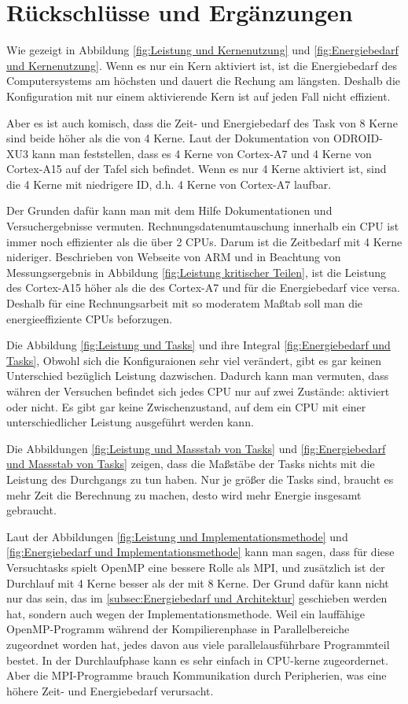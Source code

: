 \chapter{Rückschlüsse und Ergänzungen}
\label{chap:Rueckschluesse und Ergaenzunen}

Wie gezeigt in Abbildung \ref{fig:Leistung und Kernenutzung} und \ref{fig:Energiebedarf und Kernenutzung}. Wenn es nur ein Kern aktiviert ist, ist die Energiebedarf des Computersystems am höchsten und dauert die Rechung am längsten. Deshalb die Konfiguration mit nur einem aktivierende Kern ist auf jeden Fall nicht effizient. 

Aber es ist auch komisch, dass die Zeit- und Energiebedarf des Task von 8 Kerne sind beide höher als die von 4 Kerne. Laut der Dokumentation von ODROID-XU3 kann man feststellen, dass es 4 Kerne von Cortex-A7 und 4 Kerne von Cortex-A15 auf der Tafel sich befindet. Wenn es nur 4 Kerne aktiviert ist, sind die 4 Kerne mit niedrigere ID, d.h. 4 Kerne von Cortex-A7 laufbar. 

Der Grunden dafür kann man mit dem Hilfe Dokumentationen und Versuchergebnisse vermuten. Rechnungsdatenumtauschung innerhalb ein CPU ist immer noch effizienter als die über 2 CPUs. Darum ist die Zeitbedarf mit 4 Kerne nideriger. Beschrieben von Webseite von ARM und in Beachtung von Messungsergebnis in Abbildung \ref{fig:Leistung kritischer Teilen}, ist die Leistung des Cortex-A15 höher als die des Cortex-A7 und für die Energiebedarf vice versa. Deshalb für eine Rechnungsarbeit mit so moderatem Maßtab soll man die energieeffiziente CPUs beforzugen.

Die Abbildung \ref{fig:Leistung und Tasks} und ihre Integral \ref{fig:Energiebedarf und Tasks}, Obwohl sich die Konfiguraionen sehr viel verändert, gibt es gar keinen Unterschied bezüglich Leistung dazwischen. Dadurch kann man vermuten, dass währen der Versuchen befindet sich jedes CPU nur auf zwei Zustände: aktiviert oder nicht. Es gibt gar keine Zwischenzustand, auf dem ein CPU mit einer unterschiedlicher Leistung ausgeführt werden kann.

Die Abbildungen \ref{fig:Leistung und Massstab von Tasks} und \ref{fig:Energiebedarf und Massstab von Tasks} zeigen, dass die Maßstäbe der Tasks nichts mit die Leistung des Durchgangs zu tun haben. Nur je größer die Tasks sind, braucht es mehr Zeit die Berechnung zu machen, desto wird mehr Energie insgesamt gebraucht.

Laut der Abbildungen \ref{fig:Leistung und Implementationsmethode} und \ref{fig:Energiebedarf und Implementationsmethode} kann man sagen, dass für diese Versuchtasks spielt OpenMP eine bessere Rolle als MPI, und zusätzlich ist der Durchlauf mit 4 Kerne besser als der mit 8 Kerne. Der Grund dafür kann nicht nur das sein, das im \ref{subsec:Energiebedarf und Architektur} geschieben werden hat, sondern auch wegen der Implementationsmethode. Weil ein lauffähige OpenMP-Programm während der Kompilierenphase in Parallelbereiche zugeordnet worden hat, jedes davon aus viele parallelausführbare Programmteil bestet. In der Durchlaufphase kann es sehr einfach in CPU-kerne zugeordernet. Aber die MPI-Programme brauch Kommunikation durch Peripherien, was eine höhere Zeit- und Energiebedarf verursacht.

